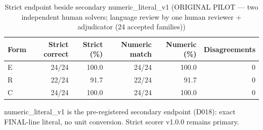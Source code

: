 \begin{table}[t]
\centering
\small
\caption{Strict endpoint beside secondary numeric\_literal\_v1 (ORIGINAL PILOT --- two independent human solvers; language review by one human reviewer + adjudicator (24 accepted families))}
\label{tab:pilotorig-Qwen3-4B-numeric}
\begin{tabular}{lrrrrr}
\toprule
Form & Strict correct & Strict (\%) & Numeric match & Numeric (\%) & Disagreements \\
\midrule
E & 24/24 & 100.0 & 24/24 & 100.0 & 0 \\
R & 22/24 & 91.7 & 22/24 & 91.7 & 0 \\
C & 24/24 & 100.0 & 24/24 & 100.0 & 0 \\
\bottomrule
\end{tabular}
\par\smallskip
\parbox{\linewidth}{\footnotesize numeric\_literal\_v1 is the pre-registered secondary endpoint (D018): exact FINAL-line literal, no unit conversion. Strict scorer v1.0.0 remains primary.}
\end{table}
